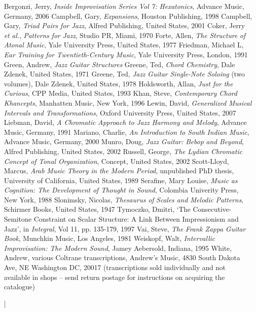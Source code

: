 \documentclass[english]{./gbook}
\begin{document}
\begin{large}
\begin{thebibliography}{99}
	Bergonzi, Jerry, \emph{Inside Improvisation Series Vol 7: Hexatonics}, Advance Music, Germany, 2006
	Campbell, Gary, \emph{Expansions}, Houston Publishing, 1998
	Campbell, Gary, \emph{Triad Pairs for Jazz}, Alfred Publishing, United States, 2001
	Coker, Jerry \emph{et al.}, \emph{Patterns for Jazz}, Studio PR, Miami, 1970
	Forte, Allen, \emph{The Structure of Atonal Music}, Yale University Press, United States, 1977
	Friedman, Michael L, \emph{Ear Training for Twentieth-Century Music}, Yale University Press, London, 1991
	Green, Andrew, \emph{Jazz Guitar Structures}
	Greene, Ted, \emph{Chord Chemistry}, Dale Zdenek, United States, 1971
	Greene, Ted, \emph{Jazz Guitar Single-Note Soloing} (two volumes), Dale Zdenek, United States, 1978
	Holdsworth, Allan, \emph{Just for the Curious}, CPP Media, United States, 1993
	Khan, Steve, \emph{Contemporary Chord Khancepts}, Manhatten Music, New York, 1996
	Lewin, David, \emph{Generalized Musical Intervals and Transformations}, Oxford University Press, United States, 2007
	Liebman, David, \emph{A Chromatic Approach to Jazz Harmony and Melody}, Advance Music, Germany, 1991
	Mariano, Charlie, \emph{An Introduction to South Indian Music}, Advance Music, Germany, 2000
	Munro, Doug, \emph{Jazz Guitar: Bebop and Beyond}, Alfred Publishing, United States, 2002
	Russell, George, \emph{The Lydian Chromatic Concept of Tonal Organization}, Concept, United States, 2002
	Scott-Lloyd, Marcus, \emph{Arab Music Theory in the Modern Period}, unpublished PhD thesis, University of California, United States, 1989
	Serafine, Mary Louise, \emph{Music as Cognition: The Development of Thought in Sound}, Colombia Univerity Press, New York, 1988
	Slonimsky, Nicolas, \emph{Thesaurus of Scales and Melodic Patterns}, Schirmer Books, United States, 1947
	Tymoczko, Dmitri, `The Consecutive-Semitone Constraint on Scalar Structure: A Link Between Impressionism and Jazz', in \emph{Integral}, Vol 11, pp. 135-179, 1997
	Vai, Steve, \emph{The Frank Zappa Guitar Book}, Munchkin Music, Los Angeles, 1981
	Weiskopf, Walt, \emph{Intervallic Improvisation: The Modern Sound}, Jamey Aebersold, Indiana, 1995
	White, Andrew, various Coltrane transcriptions, Andrew's Music, 4830 South Dakota Ave, NE Washington DC, 20017 (transcriptions sold individually and not available in shops -- send return postage for instructions on acquiring the catalogue)
\end{thebibliography}|

\end{large}
\end{document}
